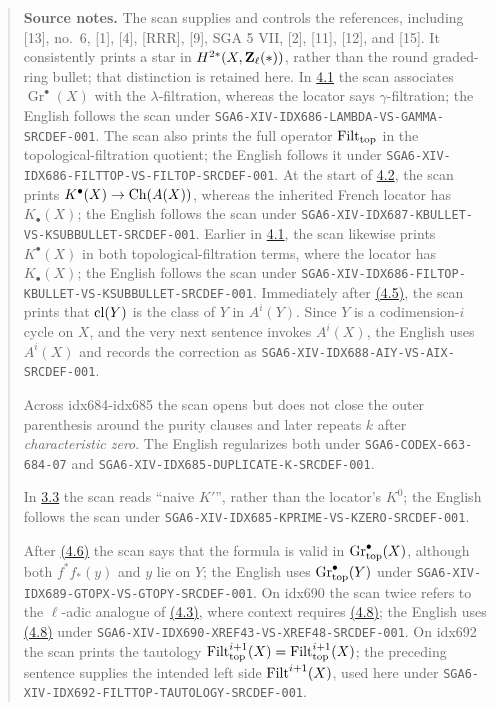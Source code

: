 \begin{quote}\footnotesize\raggedright
\textbf{Source notes.}
The scan supplies and controls the references, including [13], no.~6, [1],
[4], [RRR], [9], SGA 5 VII, [2], [11], [12], and [15]. It consistently
prints a star in $H^{2*}(X,\mathbf Z_\ell(*))$, rather than the round graded-ring
bullet; that distinction is retained here. In \hyperlink{sga6.e14.para.4-1}{4.1} the scan associates
$\operatorname{Gr}^\bullet(X)$ with the $\lambda$-filtration, whereas the
locator says $\gamma$-filtration; the English follows the scan under
\nolinkurl{SGA6-XIV-IDX686-LAMBDA-VS-GAMMA-SRCDEF-001}. The scan also prints
the full operator $\operatorname{Filt}_{\mathrm{top}}$ in the topological-filtration
quotient; the English follows it under
\nolinkurl{SGA6-XIV-IDX686-FILTTOP-VS-FILTOP-SRCDEF-001}. At the start of \hyperlink{sga6.e14.para.4-2}{4.2},
the scan
prints $K^\bullet(X)\to\operatorname{Ch}(A(X))$, whereas the inherited French locator has
$K_\bullet(X)$; the English follows the scan under
\nolinkurl{SGA6-XIV-IDX687-KBULLET-VS-KSUBBULLET-SRCDEF-001}. Earlier in \hyperlink{sga6.e14.para.4-1}{4.1}, the
scan likewise prints $K^\bullet(X)$ in both topological-filtration terms,
where the locator has $K_\bullet(X)$; the English follows the scan under
\nolinkurl{SGA6-XIV-IDX686-FILTOP-KBULLET-VS-KSUBBULLET-SRCDEF-001}. Immediately after \hyperlink{sga6.e14.para.4-5}{(4.5)}, the
scan prints that $\operatorname{cl}(Y)$ is the class of $Y$ in $A^i(Y)$. Since $Y$ is a
codimension-$i$ cycle on $X$, and the very next sentence invokes $A^i(X)$,
the English uses $A^i(X)$ and records the correction as
\nolinkurl{SGA6-XIV-IDX688-AIY-VS-AIX-SRCDEF-001}.

Across idx684-idx685 the scan opens but does not close the outer parenthesis
around the purity clauses and later repeats $k$ after \emph{characteristic
zero}. The English regularizes both under
\nolinkurl{SGA6-CODEX-663-684-07} and
\nolinkurl{SGA6-XIV-IDX685-DUPLICATE-K-SRCDEF-001}.

In \hyperlink{sga6.e14.para.3-3}{3.3} the scan reads ``naive $K'$'', rather than the locator's $K^0$; the
English follows the scan under
\nolinkurl{SGA6-XIV-IDX685-KPRIME-VS-KZERO-SRCDEF-001}.

After \hyperlink{sga6.e14.para.4-6}{(4.6)} the scan says that the formula is valid in
$\operatorname{Gr}_{\mathrm{top}}^\bullet(X)$, although both $f^*f_*(y)$ and $y$ lie on $Y$; the
English uses $\operatorname{Gr}_{\mathrm{top}}^\bullet(Y)$ under
\nolinkurl{SGA6-XIV-IDX689-GTOPX-VS-GTOPY-SRCDEF-001}. On idx690 the scan
twice refers to the $\ell$-adic analogue of \hyperlink{sga6.e14.para.4-3}{(4.3)}, where context requires
\hyperlink{sga6.e14.para.4-8}{(4.8)}; the English uses \hyperlink{sga6.e14.para.4-8}{(4.8)} under
\nolinkurl{SGA6-XIV-IDX690-XREF43-VS-XREF48-SRCDEF-001}. On idx692 the scan
prints the tautology
$\operatorname{Filt}_{\mathrm{top}}^{i+1}(X)=\operatorname{Filt}_{\mathrm{top}}^{i+1}(X)$; the
preceding sentence supplies the intended left side $\operatorname{Filt}^{i+1}(X)$, used
here under \nolinkurl{SGA6-XIV-IDX692-FILTTOP-TAUTOLOGY-SRCDEF-001}.


\end{quote}
